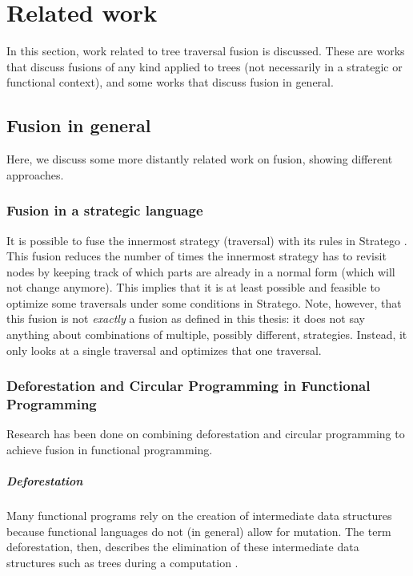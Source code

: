 
\chapter{\label{chap:related-work}Related work}
\label{chap:rw}
In this section, work related to tree traversal fusion is discussed. These are works that discuss fusions of any kind applied to trees (not necessarily in a strategic or functional context), and some works that discuss fusion in general.

\section{Fusion in general}
Here, we discuss some more distantly related work on fusion, showing different approaches.

\subsection{Fusion in a strategic language}
It is possible to fuse the innermost strategy (traversal) with its rules in Stratego \autocite{JohannV01}. This fusion reduces the number of times the innermost strategy has to revisit nodes by keeping track of which parts are already in a normal form (which will not change anymore). This implies that it is at least possible and feasible to optimize some traversals under some conditions in Stratego. Note, however, that this fusion is not \textit{exactly} a fusion as defined in this thesis: it does not say anything about combinations of multiple, possibly different, strategies. Instead, it only looks at a single traversal and optimizes that one traversal.

\subsection{Deforestation and Circular Programming in Functional Programming}
Research has been done on combining deforestation and circular programming to achieve fusion in functional programming.

\paragraph{Deforestation}
Many functional programs rely on the creation of intermediate data structures because functional languages do not (in general) allow for mutation. The term deforestation, then, describes the elimination of these intermediate data structures such as trees during a computation \autocite{FernandesCSP15}.

